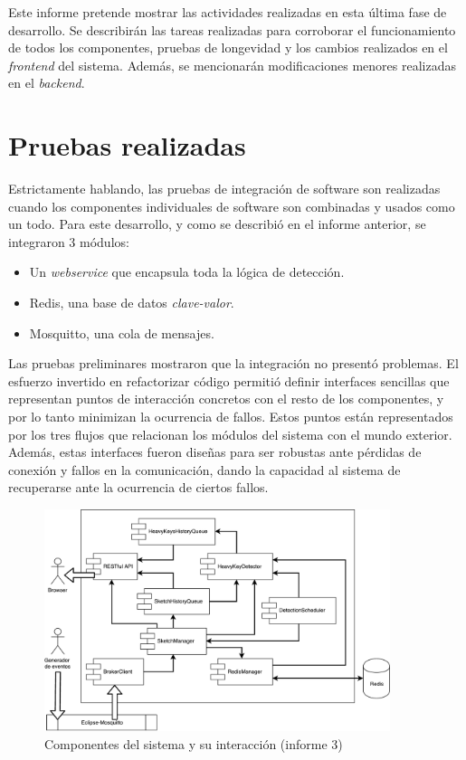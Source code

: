 \documentclass[a4paper,10pt, oneside]{article}
\begin{document}
Este informe pretende mostrar las actividades realizadas en esta última fase de desarrollo. Se describirán las tareas realizadas para corroborar el funcionamiento de todos los componentes, pruebas de longevidad y los cambios realizados en el \textit{frontend} del sistema. Además, se mencionarán modificaciones menores realizadas en el \textit{backend}.
\newpage

\section{Pruebas realizadas}
Estrictamente hablando, las pruebas de integración de software son realizadas cuando los componentes individuales de software son combinadas y usados como un todo. Para este desarrollo, y como se describió en el informe anterior, se integraron 3 módulos:
\begin{itemize}
	\item Un \textit{webservice} que encapsula toda la lógica de detección.
	\item Redis, una base de datos \textit{clave-valor}.
	\item Mosquitto, una cola de mensajes.
\end{itemize}
Las pruebas preliminares mostraron que la integración no presentó problemas. El esfuerzo invertido en refactorizar código permitió definir interfaces sencillas que representan puntos de interacción concretos con el resto de los componentes, y por lo tanto minimizan la ocurrencia de fallos. Estos puntos están representados por los tres flujos que relacionan los módulos del sistema con el mundo exterior. Además, estas interfaces fueron diseñas para ser robustas ante pérdidas de conexión y fallos en la comunicación, dando la capacidad al sistema de recuperarse ante la ocurrencia de ciertos fallos.   

\begin{figure}[htbp]
	\centering
	\includegraphics[width=0.9\textwidth]{../informe_3/graph/system_components.pdf}
	\caption{Componentes del sistema y su interacción (informe 3)}
	\label{fig:system_components}
\end{figure}
\end{document}
